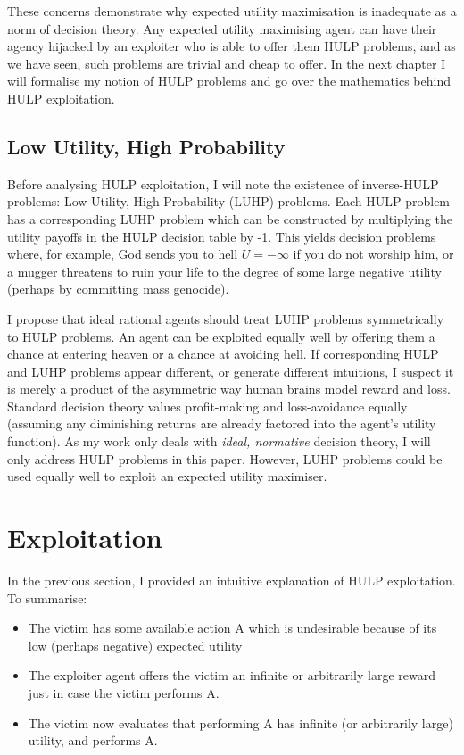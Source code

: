 \documentclass{article}
\begin{document}
These concerns demonstrate why expected utility maximisation is inadequate as a norm of decision theory. Any expected utility maximising agent can have their agency hijacked by an exploiter who is able to offer them HULP problems, and as we have seen, such problems are trivial and cheap to offer. In the next chapter I will formalise my notion of HULP problems and go over the mathematics behind HULP exploitation.

\subsection{Low Utility, High Probability}

Before analysing HULP exploitation, I will note the existence of inverse-HULP problems: Low Utility, High Probability (LUHP) problems. Each HULP problem has a corresponding LUHP problem which can be constructed by multiplying the utility payoffs in the HULP decision table by -1. This yields decision problems where, for example, God sends you to hell \(U=-\infty\) if you do not worship him, or a mugger threatens to ruin your life to the degree of some large negative utility (perhaps by committing mass genocide). 

I propose that ideal rational agents should treat LUHP problems symmetrically to HULP problems. An agent can be exploited equally well by offering them a chance at entering heaven or a chance at avoiding hell. If corresponding HULP and LUHP problems appear different, or generate different intuitions, I suspect it is merely a product of the asymmetric way human brains model reward and loss. Standard decision theory values profit-making and loss-avoidance equally (assuming any diminishing returns are already factored into the agent's utility function). As my work only deals with \textit{ideal, normative} decision theory, I will only address HULP problems in this paper. However, LUHP problems could be used equally well to exploit an expected utility maximiser.

\section{Exploitation}

In the previous section, I provided an intuitive explanation of HULP exploitation. To summarise:

\begin{itemize}
\item The victim has some available action A which is undesirable because of its low (perhaps negative) expected utility
\item The exploiter agent offers the victim an infinite or arbitrarily large reward just in case the victim performs A. 
\item The victim now evaluates that performing A has infinite (or arbitrarily large) utility, and performs A.
\end{itemize}
\end{document}
